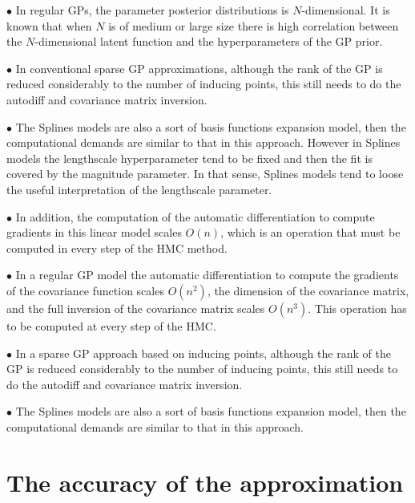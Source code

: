 \documentclass[]{interact}
\theoremstyle{plain}%
\theoremstyle{definition}
\theoremstyle{remark}
\begin{document}
\vspace{2mm}
$\bullet$ In regular GPs, the parameter posterior distributions is $N$-dimensional. It is known that when $N$ is of medium or large size there is high correlation between the $N$-dimensional latent function and the hyperparameters of the GP prior.

\vspace{2mm}
$\bullet$ In conventional sparse GP approximations, although the rank of the GP is reduced considerably to the number of inducing points, this still needs to do the autodiff and covariance matrix inversion.

\vspace{2mm}
$\bullet$ The Splines models are also a sort of basis functions expansion model, then the computational demands are similar to that in this approach. However in Splines models the lengthscale hyperparameter tend to be fixed and then the fit is covered by the magnitude parameter. In that sense, Splines models tend to loose the useful interpretation of the lengthscale parameter.

\vspace{2mm}
$\bullet$ In addition, the computation of the automatic differentiation to compute gradients in this linear model scales $O(n)$, which is an operation that must be computed in every step of the HMC method.

\vspace{2mm}
$\bullet$ In a regular GP model the automatic differentiation to compute the gradients of the covariance function scales $O(n^2)$, the dimension of the covariance matrix, and the full inversion of the covariance matrix scales $O(n^3)$. This operation has to be computed at every step of the HMC.

\vspace{2mm}
$\bullet$ In a sparse GP approach based on inducing points, although the rank of the GP is reduced considerably to the number of inducing points, this still needs to do the autodiff and covariance matrix inversion.

\vspace{2mm}
$\bullet$ The Splines models are also a sort of basis functions expansion model, then the computational demands are similar to that in this approach.


\section{The accuracy of the approximation}
\end{document}
